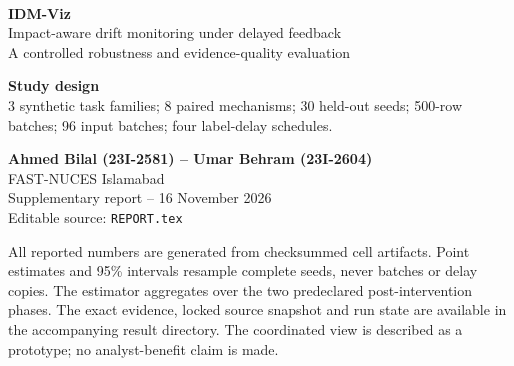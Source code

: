 \documentclass[11pt,a4paper]{article}
\begin{document}
\begin{titlepage}\color{ink}
\vspace*{12mm}{\large\textcolor{teal}{DATA ANALYSIS AND VISUALIZATION -- PHASE 3}}\\[18mm]
{\Huge\bfseries IDM-Viz}\\[4mm]
{\LARGE Impact-aware drift monitoring under delayed feedback}\\[8mm]
{\Large A controlled robustness and evidence-quality evaluation}\\[20mm]
\begin{tcolorbox}[colback=mist,colframe=teal,boxrule=0pt,leftrule=2.2mm,arc=1.5mm]
\textbf{Study design}\\
3 synthetic task families; 8 paired mechanisms; 30 held-out seeds; 500-row batches; 96 input batches; four label-delay schedules.
\end{tcolorbox}
\vfill
\textbf{Ahmed Bilal (23I-2581) -- Umar Behram (23I-2604)}\\
FAST-NUCES Islamabad\\[4mm]
Supplementary report -- 16 November 2026\\
Editable source: \texttt{REPORT.tex}
\end{titlepage}
\tableofcontents\clearpage
\begin{abstract}
This supplementary evaluation strengthens the Phase 3 implementation with paired, controlled drift mechanisms and an explicit input-before-label release runner. It compares a frozen isotonic Average-Confidence estimator with raw confidence, an ATC-style estimator and historical accuracy; measures original-feature/PCA and pairwise-correlation input evidence; and verifies cached predictions after delays of 0, 5, 20 and 100 batches. The locked held-out matrix contains \textbf{720 complete task--mechanism--seed cells}; the primary comparison uses eight features and \textbf{30 independent seed blocks}. Results are conditional on the stated synthetic laws. They do not establish general transfer, causal attribution, certified harm probability, future-risk performance, or improved analyst decisions.
\end{abstract}

\begin{tcolorbox}[breakable,colback=mist,colframe=ink,boxrule=.4pt,title=Interpretation at a glance]
All reported numbers are generated from checksummed cell artifacts. Point estimates and 95\% intervals resample complete seeds, never batches or delay copies. The estimator aggregates over the two predeclared post-intervention phases. The exact evidence, locked source snapshot and run state are available in the accompanying result directory. The coordinated view is described as a prototype; no analyst-benefit claim is made.
\end{tcolorbox}
\end{document}
